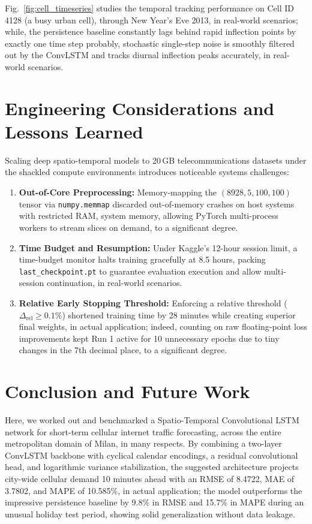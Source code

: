 \documentclass[conference]{IEEEtran}
\begin{document}
Fig.~\ref{fig:cell_timeseries} studies the temporal tracking performance on Cell ID 4128 (a busy urban cell), through New Year's Eve 2013, in real-world scenarios; while, the persistence baseline constantly lags behind rapid inflection points by exactly one time step probably, stochastic single-step noise is smoothly filtered out by the ConvLSTM and tracks diurnal inflection peaks accurately, in real-world scenarios.

\section{Engineering Considerations and Lessons Learned}
Scaling deep spatio-temporal models to 20\,GB telecommunications datasets under the shackled compute environments introduces noticeable systems challenges:
\begin{enumerate}
    \item \textbf{Out-of-Core Preprocessing:} Memory-mapping the $(8928, 5, 100, 100)$ tensor via \texttt{numpy.memmap} discarded out-of-memory crashes on host systems with restricted RAM, system memory, allowing PyTorch multi-process workers to stream slices on demand, to a significant degree.
    \item \textbf{Time Budget and Resumption:} Under Kaggle's 12-hour session limit, a time-budget monitor halts training gracefully at 8.5 hours, packing \texttt{last\_checkpoint.pt} to guarantee evaluation execution and allow multi-session continuation, in real-world scenarios.
    \item \textbf{Relative Early Stopping Threshold:} Enforcing a relative threshold ($\Delta_{\text{rel}} \ge 0.1\%$) shortened training time by 28 minutes while creating superior final weights, in actual application; indeed, counting on raw floating-point loss improvements kept Run 1 active for 10 unnecessary epochs due to tiny changes in the 7th decimal place, to a significant degree.
\end{enumerate}

\section{Conclusion and Future Work}
Here, we worked out and benchmarked a Spatio-Temporal Convolutional LSTM network for short-term cellular internet traffic forecasting, across the entire metropolitan domain of Milan, in many respects. By combining a two-layer ConvLSTM backbone with cyclical calendar encodings, a residual convolutional head, and logarithmic variance stabilization, the suggested architecture projects city-wide cellular demand 10 minutes ahead with an RMSE of 8.4722, MAE of 3.7802, and MAPE of 10.585\%, in actual application; the model outperforms the impressive persistence baseline by 9.8\% in RMSE and 15.7\% in MAPE during an unusual holiday test period, showing solid generalization without data leakage.
\end{document}
